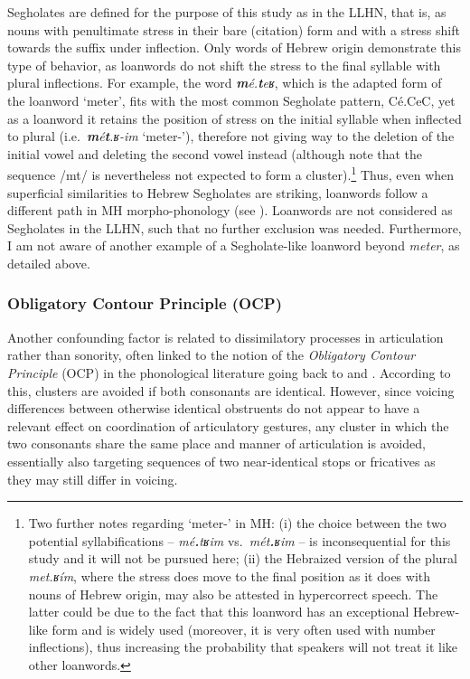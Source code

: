 Segholates are defined for the purpose of this study as in the LLHN, that is, as nouns with penultimate stress in their bare (citation) form and with a stress shift towards the suffix under inflection. Only words of Hebrew origin demonstrate this type of behavior, as loanwords do not shift the stress to the final syllable with plural inflections. For example, the word \emph{\textbf{m}é.\textbf{t}eʁ},
which is the adapted form of the loanword `meter', fits with the most common Segholate pattern, Cé.CeC, yet as a loanword it retains the position of stress on the initial syllable when inflected to plural (i.e.~\emph{\textbf{m}é\textbf{t}.ʁ-im} `meter-\Pl{}'),
therefore not giving way to the deletion of the initial vowel and deleting the second vowel instead (although note that the sequence /mt/ is nevertheless not expected to form a cluster).{\footnote{Two further notes regarding `meter-\Pl{}' in MH: (i) the choice between the two potential syllabifications -- \emph{mé\textbf{.}tʁim} vs.~\emph{mét\textbf{.}ʁim} -- is inconsequential for this study and it will not be pursued here; (ii) the Hebraized version of the plural \emph{met.ʁím}, where the stress does move to the final position as it does with nouns of Hebrew origin, may also be attested in hypercorrect speech. The latter could be due to the fact that this loanword has an exceptional Hebrew-like form and is widely used (moreover, it is very often used with number inflections), thus increasing the probability that speakers will not treat it like other loanwords.}} Thus, even when superficial similarities to Hebrew Segholates are striking, loanwords follow a different path in MH morpho-phonology (see \citealt{bat1994stemsk, cohen2009role}). Loanwords are not considered as Segholates in the LLHN, such that no further exclusion was needed. Furthermore, I am not aware of another example of a Segholate-like loanword beyond \emph{meter}, as detailed above.

\subsubsection{Obligatory Contour Principle (OCP)}\label{sec:ocp}

Another confounding factor is related to dissimilatory processes in articulation rather than sonority, often linked to the notion of the \emph{Obligatory Contour Principle} (OCP) in the phonological literature going back to \citet{leben1973suprasegmental, goldsmith1976autosegmental} and \citet{mccarthy1979formalsk}. According to this, clusters are avoided if both consonants are identical. However, since voicing differences between otherwise identical obstruents do not appear to have a relevant effect on coordination of articulatory gestures, any cluster in which the two consonants share the same place and manner of articulation is avoided, essentially also targeting sequences of two near-identical stops or fricatives as they may still differ in voicing.

